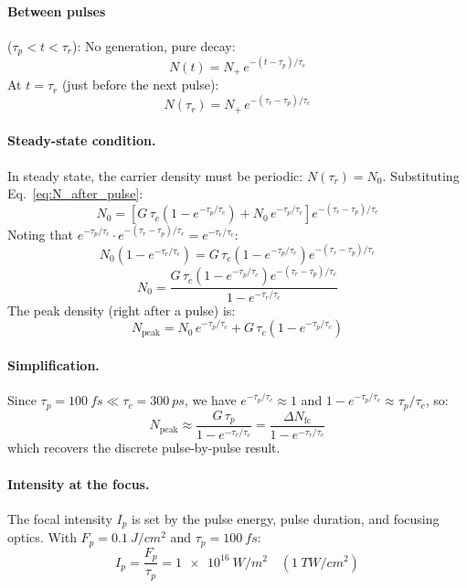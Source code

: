 \documentclass[11pt,a4paper]{article}
\begin{document}
\paragraph{Between pulses} ($\tau_p < t < \tau_r$): No generation, pure decay:
\begin{equation}
N(t) = N_+\,e^{-(t - \tau_p)/\tau_c}
\label{eq:between_pulses}
\end{equation}
At $t = \tau_r$ (just before the next pulse):
\[
N(\tau_r) = N_+\,e^{-(\tau_r - \tau_p)/\tau_c}
\]

\paragraph{Steady-state condition.} In steady state, the carrier density must be periodic: $N(\tau_r) = N_0$. Substituting Eq.~\eqref{eq:N_after_pulse}:
\[
N_0 = \left[G\,\tau_c\!\left(1 - e^{-\tau_p/\tau_c}\right) + N_0\,e^{-\tau_p/\tau_c}\right] e^{-(\tau_r - \tau_p)/\tau_c}
\]
Noting that $e^{-\tau_p/\tau_c} \cdot e^{-(\tau_r - \tau_p)/\tau_c} = e^{-\tau_r/\tau_c}$:
\[
N_0\!\left(1 - e^{-\tau_r/\tau_c}\right) = G\,\tau_c\!\left(1 - e^{-\tau_p/\tau_c}\right) e^{-(\tau_r - \tau_p)/\tau_c}
\]
\begin{equation}
\boxed{N_0 = \frac{G\,\tau_c\!\left(1 - e^{-\tau_p/\tau_c}\right) e^{-(\tau_r - \tau_p)/\tau_c}}{1 - e^{-\tau_r/\tau_c}}}
\label{eq:N0_exact}
\end{equation}
The peak density (right after a pulse) is:
\begin{equation}
N_\text{peak} = N_0\,e^{-\tau_p/\tau_c} + G\,\tau_c\!\left(1 - e^{-\tau_p/\tau_c}\right)
\label{eq:Npeak_exact}
\end{equation}

\paragraph{Simplification.} Since $\tau_p = \SI{100}{fs} \ll \tau_c = \SI{300}{ps}$, we have $e^{-\tau_p/\tau_c} \approx 1$ and $1 - e^{-\tau_p/\tau_c} \approx \tau_p/\tau_c$, so:
\[
N_\text{peak} \approx \frac{G\,\tau_p}{1 - e^{-\tau_r/\tau_c}} = \frac{\Delta N_\text{fc}}{1 - e^{-\tau_r/\tau_c}}
\]
which recovers the discrete pulse-by-pulse result.

\paragraph{Intensity at the focus.} The focal intensity $I_p$ is set by the pulse energy, pulse duration, and focusing optics. With $F_p = \SI{0.1}{J/cm^2}$ and $\tau_p = \SI{100}{fs}$:
\[
I_p = \frac{F_p}{\tau_p} = \SI{1e16}{W/m^2} \quad (\SI{1}{TW/cm^2})
\]
\end{document}
